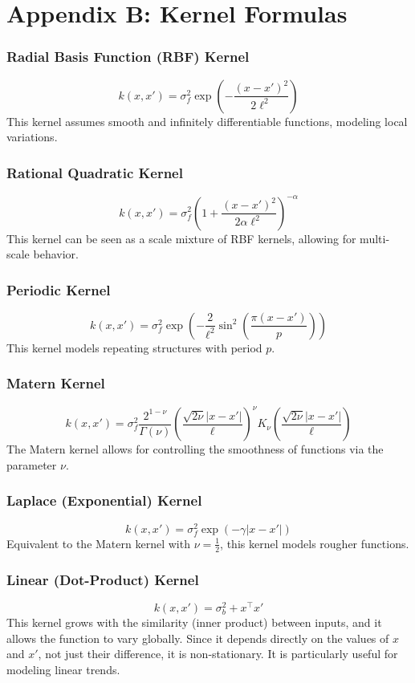 \documentclass{article}
\begin{document}
\section{Appendix B: Kernel Formulas}
\label{appendix:B}
\subsubsection*{Radial Basis Function (RBF) Kernel}
\[
k(x, x') = \sigma_f^2 \exp\left( -\frac{(x - x')^2}{2\ell^2} \right)
\]
This kernel assumes smooth and infinitely differentiable functions, modeling local variations.


\subsubsection*{Rational Quadratic Kernel}
\[
k(x, x') = \sigma_f^2 \left( 1 + \frac{(x - x')^2}{2 \alpha \ell^2} \right)^{-\alpha}
\]
This kernel can be seen as a scale mixture of RBF kernels, allowing for multi-scale behavior.


\subsubsection*{Periodic Kernel}
\[
k(x, x') = \sigma_f^2 \exp\left( -\frac{2}{\ell^2} \sin^2\left( \frac{\pi (x - x')}{p} \right) \right)
\]
This kernel models repeating structures with period \( p \).

\subsubsection*{Matern Kernel}
\[
k(x, x') = \sigma_f^2 \frac{2^{1-\nu}}{\Gamma(\nu)} \left( \frac{\sqrt{2\nu} |x - x'|}{\ell} \right)^\nu K_\nu\left( \frac{\sqrt{2\nu} |x - x'|}{\ell} \right)
\]
The Matern kernel allows for controlling the smoothness of functions via the parameter \( \nu \).


\subsubsection*{Laplace (Exponential) Kernel}
\[
k(x, x') = \sigma_f^2 \exp\left( -\gamma |x - x'| \right)
\]
Equivalent to the Matern kernel with \( \nu = \frac{1}{2} \), this kernel models rougher functions.


\subsubsection*{Linear (Dot-Product) Kernel}
\[
k(x, x') = \sigma_b^2 + x^\top x'
\]
This kernel grows with the similarity (inner product) between inputs, and it allows the function to vary globally. Since it depends directly on the values of \( x \) and \( x' \), not just their difference, it is non-stationary. It is particularly useful for modeling linear trends.
\end{document}
